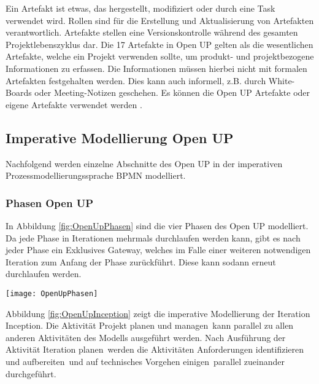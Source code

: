Ein Artefakt ist etwas, das hergestellt, modifiziert oder durch eine Task verwendet wird. Rollen sind 
für die Erstellung und Aktualisierung von Artefakten verantwortlich. Artefakte stellen eine Versionskontrolle während des gesamten Projektlebenszyklus dar. Die 17 Artefakte in Open UP gelten als die wesentlichen Artefakte, welche ein Projekt verwenden sollte, um produkt- und projektbezogene Informationen zu erfassen. Die Informationen müssen hierbei nicht mit formalen Artefakten festgehalten werden. Dies kann auch informell, z.B. durch White-Boards oder Meeting-Notizen geschehen. Es können die Open UP Artefakte oder eigene Artefakte verwendet werden \cite{eclipseopenup}.

\subsection{Imperative Modellierung Open UP}

Nachfolgend werden einzelne Abschnitte des Open UP in der imperativen Prozessmodellierungssprache BPMN modelliert.

 \subsubsection{Phasen Open UP}

In Abbildung \ref{fig:OpenUpPhasen} sind die vier Phasen des Open UP modelliert. Da jede Phase in Iterationen mehrmals durchlaufen werden kann, gibt es nach jeder Phase ein Exklusives Gateway, welches im Falle einer weiteren notwendigen Iteration zum Anfang der Phase zurückführt. Diese kann sodann erneut durchlaufen werden.

\begin{sidewaysfigure}[htp]
\begin{center}
  \texttt{[image: OpenUpPhasen]} %
  \caption{Phasen Open UP- imperativ}
  \label{fig:OpenUpPhasen}
\end{center}
\end{sidewaysfigure}

Abbildung \ref{fig:OpenUpInception} zeigt die imperative Modellierung der Iteration \grqq Inception\grqq. Die Aktivität \grqq Projekt planen und managen\grqq \ kann parallel zu allen anderen Aktivitäten des Modells ausgeführt werden.\newline
Nach Ausführung der Aktivität \grqq Iteration planen\grqq \ werden die Aktivitäten \grqq Anforderungen identifizieren und aufbereiten\grqq \ und \grqq auf technisches Vorgehen einigen\grqq \ parallel zueinander durchgeführt.

